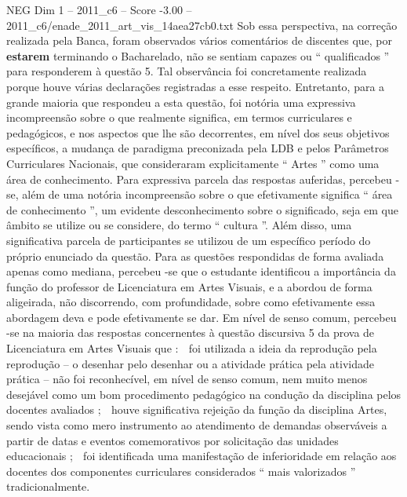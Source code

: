 \begin{textsample}{NEG Dim 1 – 2011\_c6 – Score -3.00 – 2011\_c6/enade\_2011\_art\_vis\_14aea27cb0.txt}
Sob essa perspectiva, na correção realizada pela Banca, foram observados vários comentários de discentes que, por \textbf{estarem} terminando o Bacharelado, não se sentiam capazes ou “ qualificados ” para responderem à questão 5.
Tal observância foi concretamente realizada porque houve várias declarações registradas a esse respeito.
Entretanto, para a grande maioria que respondeu a esta questão, foi notória uma expressiva incompreensão sobre o que realmente significa, em termos curriculares e pedagógicos, e nos aspectos que lhe são decorrentes, em nível dos seus objetivos específicos, a mudança de paradigma preconizada pela LDB e pelos Parâmetros Curriculares Nacionais, que consideraram explicitamente “ Artes ” como uma área de conhecimento.
Para expressiva parcela das respostas auferidas, percebeu -se, além de uma notória incompreensão sobre o que efetivamente significa “ área de conhecimento ”, um evidente desconhecimento sobre o significado, seja em que âmbito se utilize ou se considere, do termo “ cultura ”.
Além disso, uma significativa parcela de participantes se utilizou de um específico período do próprio enunciado da questão.
Para as questões respondidas de forma avaliada apenas como mediana, percebeu -se que o estudante identificou a importância da função do professor de Licenciatura em Artes Visuais, e a abordou de forma aligeirada, não discorrendo, com profundidade, sobre como efetivamente essa abordagem deva e pode efetivamente se dar.
Em nível de senso comum, percebeu -se na maioria das respostas concernentes à questão discursiva 5 da prova de Licenciatura em Artes Visuais que :  foi utilizada a ideia da reprodução pela reprodução – o desenhar pelo desenhar ou a atividade prática pela atividade prática – não foi reconhecível, em nível de senso comum, nem muito menos desejável como um bom procedimento pedagógico na condução da disciplina pelos docentes avaliados ;  houve significativa rejeição da função da disciplina Artes, sendo vista como mero instrumento ao atendimento de demandas observáveis a partir de datas e eventos comemorativos por solicitação das unidades educacionais ;  foi identificada uma manifestação de inferioridade em relação aos docentes dos componentes curriculares considerados “ mais valorizados ” tradicionalmente.

\end{textsample}
